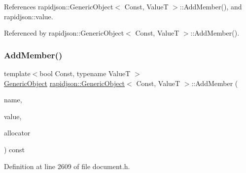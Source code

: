 References rapidjson\+::\+Generic\+Object$<$ Const, Value\+T $>$\+::\+Add\+Member(), and rapidjson\+::value.



Referenced by rapidjson\+::\+Generic\+Object$<$ Const, Value\+T $>$\+::\+Add\+Member().

\mbox{\label{classrapidjson_1_1_generic_object_aebd8b710e89673cd279b798ba2f3cf85}} 
\subsubsection{\texorpdfstring{AddMember()}{AddMember()}\hspace{0.1cm}{\footnotesize\ttfamily [2/4]}}
{\footnotesize\ttfamily template$<$bool Const, typename ValueT $>$ \\
\mbox{\hyperlink{classrapidjson_1_1_generic_object}{Generic\+Object}} \mbox{\hyperlink{classrapidjson_1_1_generic_object}{rapidjson\+::\+Generic\+Object}}$<$ Const, ValueT $>$\+::Add\+Member (\begin{DoxyParamCaption}\item[{\mbox{\hyperlink{classrapidjson_1_1_generic_object_a282660500748eff5ebab93b88a9d478f}{Value\+Type}} \&}]{name,  }\item[{\mbox{\hyperlink{classrapidjson_1_1_generic_object_ab47bc8d841321d77c140e9df729f5233}{String\+Ref\+Type}}}]{value,  }\item[{\mbox{\hyperlink{classrapidjson_1_1_generic_object_ae30003e248368737382eed69ec8fe1eb}{Allocator\+Type}} \&}]{allocator }\end{DoxyParamCaption}) const}



Definition at line 2609 of file document.\+h.


\begin{DoxyCode}{0}

\end{DoxyCode}


